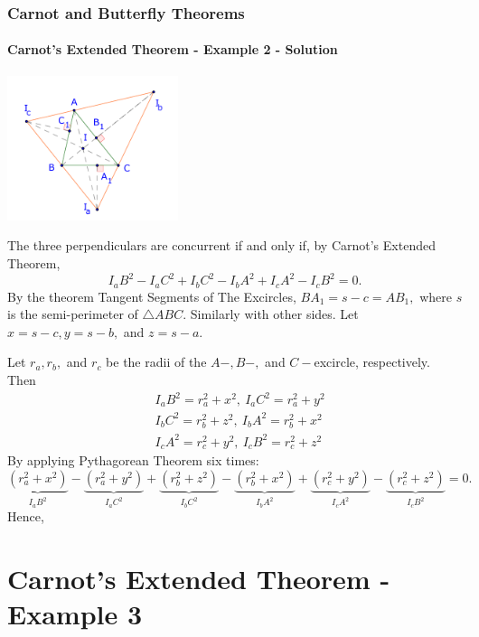 \documentclass[8pt,xcolor=table,dvipsnames]{beamer}
\begin{document}
\begin{frame}[t]
    \frametitle{Carnot and Butterfly Theorems}
    \framesubtitle{Carnot's Extended Theorem - Example 2 - Solution}
    \begin{center}
        \includegraphics[width=5cm]{./svg/pdf/24-25-s7-g3-p2.pdf}
    \end{center}
    \begin{overprint}
        The three perpendiculars are concurrent if and only if, by Carnot's Extended Theorem,
        \[ {I_aB}^2 - {I_aC}^2 + {I_bC}^2 - {I_bA}^2 + {I_cA}^2 - {I_cB}^2 = 0. \]
        By the theorem Tangent Segments of The Excircles, $BA_1 = s - c = AB_1,$
        where $s$ is the semi-perimeter of $\triangle ABC.$ Similarly with other sides.
        Let $x = s-c, y =s-b,$ and $z = s-a.$

        Let $r_a, r_b,$ and $r_c$ be the radii of the $A-, B-,$ and $C-$excircle, respectively.
        Then \[
            \begin{aligned}
                &{I_aB}^2 = r_a^2 + x^2,\ {I_aC}^2 = r_a^2 + y^2\\
                &{I_bC}^2 = r_b^2 + z^2,\ {I_bA}^2 = r_b^2 + x^2\\
                &{I_cA}^2 = r_c^2 + y^2,\ {I_cB}^2 = r_c^2 + z^2
            \end{aligned}
        \]
        By applying Pythagorean Theorem six times:
        \[
            \underbrace{(r_a^2 + x^2)}_{{I_aB}^2} - \underbrace{(r_a^2 + y^2)}_{{I_aC}^2} + \underbrace{(r_b^2 + z^2)}_{{I_bC}^2} 
            - \underbrace{(r_b^2 + x^2)}_{{I_bA}^2} + \underbrace{(r_c^2 + y^2)}_{{I_cA}^2} - \underbrace{(r_c^2 + z^2)}_{{I_cB}^2} = 0.
        \]
        Hence, 
    \end{overprint}
\end{frame}

\section{Carnot's Extended Theorem - Example 3}
\end{document}
